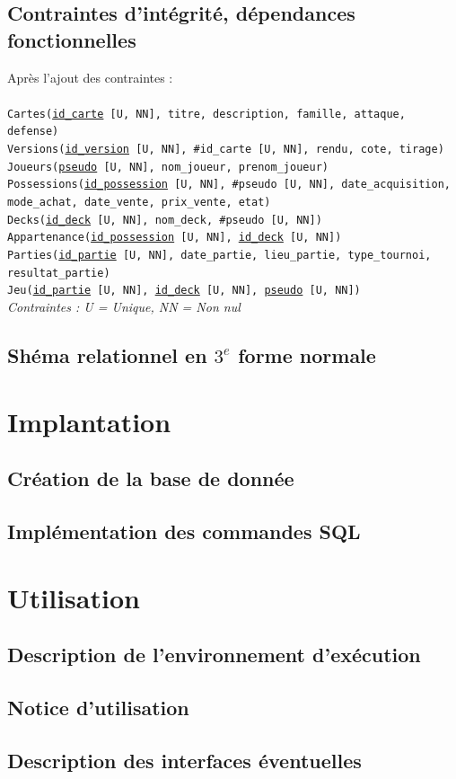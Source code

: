 \documentclass[a4paper,10.5pt]{article}
\begin{document}
\subsection{Contraintes d'intégrité, dépendances fonctionnelles}
Après l'ajout des contraintes : \\
\\
\texttt{Cartes(\underline{id\_carte} [U, NN], titre, description, famille, attaque, defense)} \\
\texttt{Versions(\underline{id\_version} [U, NN], \#id\_carte [U, NN], rendu, cote, tirage)} \\
\texttt{Joueurs(\underline{pseudo} [U, NN], nom\_joueur, prenom\_joueur)} \\
\texttt{Possessions(\underline{id\_possession} [U, NN], \#pseudo [U, NN], date\_acquisition, mode\_achat, date\_vente, prix\_vente, etat)} \\
\texttt{Decks(\underline{id\_deck} [U, NN], nom\_deck, \#pseudo [U, NN])} \\
\texttt{Appartenance(\underline{id\_possession} [U, NN], \underline{id\_deck} [U, NN])} \\
\texttt{Parties(\underline{id\_partie} [U, NN], date\_partie, lieu\_partie, type\_tournoi, resultat\_partie)} \\
\texttt{Jeu(\underline{id\_partie} [U, NN], \underline{id\_deck} [U, NN], \underline{pseudo} [U, NN])} \\

\textit{Contraintes : U = Unique, NN = Non nul}

\subsection{Shéma relationnel en $3^e$ forme normale}

\section{Implantation}
\subsection{Création de la base de donnée}
\subsection{Implémentation des commandes SQL}

\section{Utilisation}
\subsection{Description de l'environnement d'exécution}
\subsection{Notice d'utilisation}
\subsection{Description des interfaces éventuelles}
\end{document}
